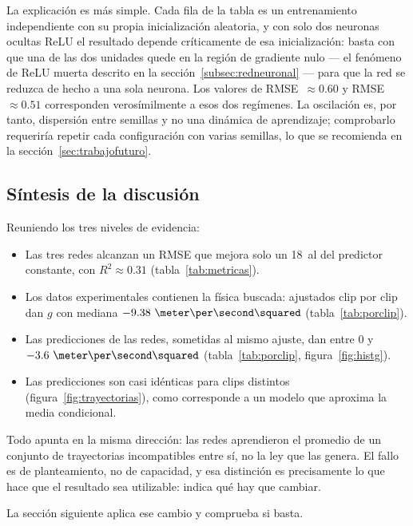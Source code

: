 \documentclass[titlepage,11pt]{article}
\providecommand{\num}[1]{\ensuremath{#1}}
\providecommand{\SI}[2]{#1\,#2}
\providecommand{\percent}{\char37\relax}
\begin{document}
La explicación es más simple. Cada fila de la tabla es un entrenamiento
independiente con su propia inicialización aleatoria, y con solo dos neuronas
ocultas ReLU el resultado depende críticamente de esa inicialización: basta con
que una de las dos unidades quede en la región de gradiente nulo --- el
fenómeno de ReLU muerta descrito en la
sección~\ref{subsec:redneuronal} --- para que la red se reduzca de hecho a una
sola neurona. Los valores de RMSE~$\approx\num{0.60}$ y
RMSE~$\approx\num{0.51}$ corresponden verosímilmente a esos dos regímenes. La
oscilación es, por tanto, dispersión entre semillas y no una dinámica de
aprendizaje; comprobarlo requeriría repetir cada configuración con varias
semillas, lo que se recomienda en la sección~\ref{sec:trabajofuturo}.

\subsection{Síntesis de la discusión}

Reuniendo los tres niveles de evidencia:

\begin{itemize}
\item Las tres redes alcanzan un RMSE que mejora solo un \SI{18}{\percent} al
  del predictor constante, con $R^2\approx\num{0.31}$
  (tabla~\ref{tab:metricas}).
\item Los datos experimentales contienen la física buscada: ajustados clip por
  clip dan $g$ con mediana $\num{-9.38}~\meter\per\second\squared$
  (tabla~\ref{tab:porclip}).
\item Las predicciones de las redes, sometidas al mismo ajuste, dan entre
  $\num{0}$ y $\num{-3.6}~\meter\per\second\squared$
  (tabla~\ref{tab:porclip}, figura~\ref{fig:histg}).
\item Las predicciones son casi idénticas para clips distintos
  (figura~\ref{fig:trayectorias}), como corresponde a un modelo que aproxima la
  media condicional.
\end{itemize}

Todo apunta en la misma dirección: las redes aprendieron el promedio de un
conjunto de trayectorias incompatibles entre sí, no la ley que las genera. El
fallo es de planteamiento, no de capacidad, y esa distinción es precisamente
lo que hace que el resultado sea utilizable: indica qué hay que cambiar.

La sección siguiente aplica ese cambio y comprueba si basta.


\end{document}
